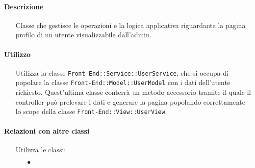 \paragraph*{Descrizione}
\begin{itemize}
\item[] Classe che gestisce le operazioni e la logica applicativa riguardante la pagina profilo di un utente visualizzabile dall'admin.
\end{itemize}

\paragraph*{Utilizzo}
\begin{itemize}
\item[] Utilizza la classe \texttt{Front-End::Service::UserService}, che si occupa di popolare la classe \texttt{Front-End::Model::UserModel} con i dati dell'utente richiesto. Quest'ultima classe conterrà un metodo accessorio tramite il quale il controller può prelevare i dati e generare la pagina popolando correttamente lo scope della classe \texttt{Front-End::View::UserView}.
\end{itemize}

\paragraph*{Relazioni con altre classi}
\begin{itemize}


\item[] Utilizza le classi:
\begin{itemize}
\item[$\bullet$] 
\end{itemize}
\end{itemize}

